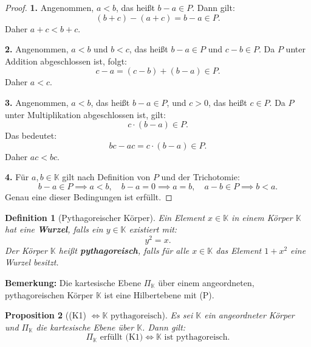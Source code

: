 \documentclass[a4paper,12pt]{article}
\theoremstyle{break}
\newtheorem{definition}{Definition}[section]
\newtheorem{proposition}[definition]{Proposition}
\begin{document}
\begin{proof}
\textbf{1.} Angenommen, \(a < b\), das heißt \(b - a \in P\). Dann gilt:
\[
(b + c) - (a + c) = b - a \in P.
\]
Daher \(a + c < b + c\).

\textbf{2.} Angenommen, \(a < b\) und \(b < c\), das heißt \(b - a \in P\) und \(c - b \in P\). Da \(P\) unter Addition abgeschlossen ist, folgt:
\[
c - a = (c - b) + (b - a) \in P.
\]
Daher \(a < c\).

\textbf{3.} Angenommen, \(a < b\), das heißt \(b - a \in P\), und \(c > 0\), das heißt \(c \in P\). Da \(P\) unter Multiplikation abgeschlossen ist, gilt:
\[
c \cdot (b - a) \in P.
\]
Das bedeutet:
\[
bc - ac = c \cdot (b - a) \in P.
\]
Daher \(ac < bc\).

\textbf{4.} Für \(a, b \in \mathbb{K}\) gilt nach Definition von \(P\) und der Trichotomie:
\[
b - a \in P \implies a < b, \quad b - a = 0 \implies a = b, \quad a - b \in P \implies b < a.
\]
Genau eine dieser Bedingungen ist erfüllt.
\end{proof}

\begin{definition}[Pythagoreischer Körper]
Ein Element \(x \in \mathbb{K}\) in einem Körper \(\mathbb{K}\) hat eine \textbf{Wurzel}, falls ein \(y \in \mathbb{K}\) existiert mit:
\[
y^2 = x.
\]
Der Körper \(\mathbb{K}\) heißt \textbf{pythagoreisch}, falls für alle \(x \in \mathbb{K}\) das Element \(1 + x^2\) eine Wurzel besitzt.
\end{definition}

\textbf{Bemerkung:}
Die kartesische Ebene \(\Pi_\mathbb{K}\) über einem angeordneten, pythagoreischen Körper \(\mathbb{K}\) ist eine Hilbertebene mit (P).

\begin{proposition}[(K1) $\iff \mathbb{K} \text{ pythagoreisch}$]
Es sei \(\mathbb{K}\) ein angeordneter Körper und \(\Pi_\mathbb{K}\) die kartesische Ebene über \(\mathbb{K}\). Dann gilt:  
\[
\Pi_\mathbb{K} \text{ erfüllt (K1)} \iff \mathbb{K} \text{ ist pythagoreisch.}
\]
\end{proposition}
\end{document}
